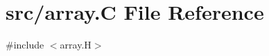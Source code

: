 \hypertarget{array_8_c}{}\section{src/array.C File Reference}
\label{array_8_c}
{\ttfamily \#include $<$array.\+H$>$}\newline
